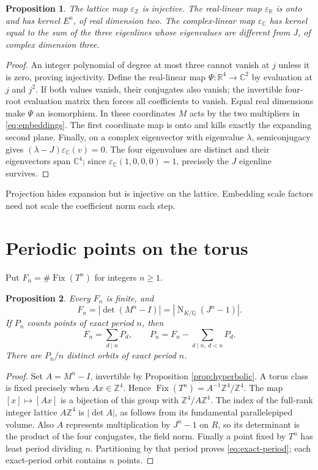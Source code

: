 \documentclass[11pt,a4paper]{article}
\newtheorem{proposition}{Proposition}
\newcommand{\Z}{\mathbb Z}
\newcommand{\Q}{\mathbb Q}
\newcommand{\R}{\mathbb R}
\newcommand{\C}{\mathbb C}
\newcommand{\Nm}{\operatorname{N}}
\newcommand{\Fix}{\operatorname{Fix}}
\begin{document}
\begin{proposition}\label{prop:evaluation}
The lattice map $\varepsilon_{\Z}$ is injective.
The real-linear map $\varepsilon_{\R}$ is onto and has kernel $E^u$,
of real dimension two. The complex-linear map $\varepsilon_{\C}$
has kernel equal to the sum of the three eigenlines whose eigenvalues
are different from $J$, of complex dimension three.
\end{proposition}
\begin{proof}
An integer polynomial of degree at most three cannot vanish at $j$
unless it is zero, proving injectivity. Define the real-linear map
$\Psi:\R^4\to\C^2$ by evaluation at $j$ and $j^2$.
If both values vanish, their conjugates also vanish; the invertible
four-root evaluation matrix then forces all coefficients to vanish.
Equal real dimensions make $\Psi$ an isomorphism. In these coordinates
$M$ acts by the two multipliers in \eqref{eq:embeddings}.
The first coordinate map is onto and kills exactly the expanding
second plane. Finally, on a complex eigenvector with eigenvalue
$\lambda$, semiconjugacy gives
$(\lambda-J)\varepsilon_{\C}(v)=0$.
The four eigenvalues are distinct and their eigenvectors span
$\C^4$; since $\varepsilon_{\C}(1,0,0,0)=1$, precisely the
$J$ eigenline survives.
\end{proof}

Projection hides expansion but is injective on the lattice.
Embedding scale factors need not scale the coefficient norm each step.

\section{Periodic points on the torus}\label{sec:periodic}
Put $F_n=\#\Fix(T^n)$ for integers $n\geq1$.

\begin{proposition}\label{prop:count}
Every $F_n$ is finite, and
\begin{equation}\label{eq:count}
 F_n=|\det(M^n-I)|=|\Nm_{K/\Q}(J^n-1)|.
\end{equation}
If $P_n$ counts points of exact period $n$, then
\begin{equation}\label{eq:exact-period}
 F_n=\sum_{d\mid n}P_d,\qquad
 P_n=F_n-\sum_{d\mid n,\ d<n}P_d.
\end{equation}
There are $P_n/n$ distinct orbits of exact period $n$.
\end{proposition}
\begin{proof}
Set $A=M^n-I$, invertible by Proposition \ref{prop:hyperbolic}.
A torus class is fixed precisely when $Ax\in\Z^4$. Hence
$\Fix(T^n)=A^{-1}\Z^4/\Z^4$.
The map $[x]\mapsto[Ax]$ is a bijection of this group with
$\Z^4/A\Z^4$. The index of the full-rank integer lattice
$A\Z^4$ is $|\det A|$, as follows from its fundamental
parallelepiped volume. Also $A$ represents multiplication by
$J^n-1$ on $R$, so its determinant is the product of the four
conjugates, the field norm. Finally a point fixed by $T^n$ has least
period dividing $n$. Partitioning by that period proves
\eqref{eq:exact-period}; each exact-period orbit contains $n$ points.
\end{proof}
\end{document}
